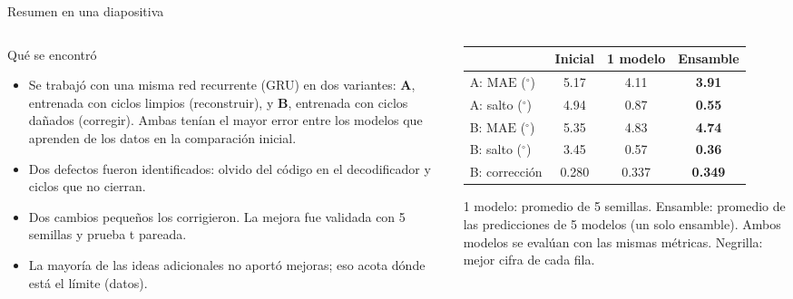 \documentclass[aspectratio=169,10pt,t]{beamer}
\newcommand{\gr}{$^\circ$}
\newcommand{\mae}{\ensuremath{\mathrm{MAE}}}
\begin{document}
\begin{frame}{Resumen en una diapositiva}
\begin{columns}[T]
\begin{column}{0.5\textwidth}
\begin{block}{Qué se encontró}
\begin{itemize}\small\setlength{\itemsep}{2pt}
\item Se trabajó con una misma red recurrente (GRU) en dos variantes: \textbf{A}, entrenada con ciclos limpios (reconstruir), y \textbf{B}, entrenada con ciclos dañados (corregir). Ambas tenían el mayor error entre los modelos que aprenden de los datos en la comparación inicial.
\item Dos defectos fueron identificados: \alert{olvido} del código en el decodificador y \alert{ciclos que no cierran}.
\item Dos cambios pequeños los corrigieron. La mejora fue validada con 5 semillas y prueba t pareada.
\item La mayoría de las ideas adicionales no aportó mejoras; eso acota dónde está el límite (datos).
\end{itemize}
\end{block}
\end{column}
\begin{column}{0.48\textwidth}
\centering\footnotesize\setlength{\tabcolsep}{3pt}
\begin{tabular}{@{}lccc@{}}
\toprule
 & \textbf{Inicial} & \textbf{1 modelo} & \textbf{Ensamble}\\
\midrule
A: \mae{} (\gr) & 5.17 & 4.11 & \textbf{3.91}\\
A: salto (\gr) & 4.94 & 0.87 & \textbf{0.55}\\
B: \mae{} (\gr) & 5.35 & 4.83 & \textbf{4.74}\\
B: salto (\gr) & 3.45 & 0.57 & \textbf{0.36}\\
B: corrección & 0.280 & 0.337 & \textbf{0.349}\\
\bottomrule
\end{tabular}

\vspace{4pt}
{\scriptsize 1 modelo: promedio de 5 semillas. Ensamble: promedio de las predicciones de 5 modelos (un solo ensamble). Ambos modelos se evalúan con las mismas métricas. Negrilla: mejor cifra de cada fila.}
\end{column}
\end{columns}
\end{frame}
\end{document}
